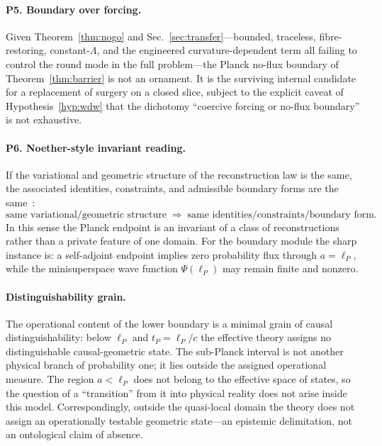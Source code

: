 \documentclass[aps,prd,twocolumn,superscriptaddress,nofootinbib,floatfix]{revtex4-2}
\theoremstyle{plain}
\theoremstyle{definition}
\newcommand{\lP}{\ell_P}
\begin{document}
\paragraph*{P5. Boundary over forcing.}
Given Theorem~\ref{thm:nogo} and Sec.~\ref{sec:transfer}---bounded, traceless, fibre-restoring, constant-$\Lambda$, and the engineered curvature-dependent term all failing to control the round mode in the full problem---the Planck no-flux boundary of Theorem~\ref{thm:barrier} is not an ornament. It is the surviving internal candidate for a replacement of surgery on a closed slice, subject to the explicit caveat of Hypothesis~\ref{hyp:wdw} that the dichotomy ``coercive forcing or no-flux boundary'' is not exhaustive.

\paragraph*{P6. Noether-style invariant reading.}
If the variational and geometric structure of the reconstruction law is the same, the associated identities, constraints, and admissible boundary forms are the same~\cite{Noether1918}:
\[
\text{same variational/geometric structure}\;\Longrightarrow\;\text{same identities/constraints/boundary form}.
\]
In this sense the Planck endpoint is an invariant of a class of reconstructions rather than a private feature of one domain. For the boundary module the sharp instance is: a self-adjoint endpoint implies zero probability flux through $a=\lP$, while the minisuperspace wave function $\Psi(\lP)$ may remain finite and nonzero.

\paragraph*{Distinguishability grain.}
The operational content of the lower boundary is a minimal grain of causal distinguishability: below $\lP$ and $t_P=\lP/c$ the effective theory assigns no distinguishable causal-geometric state. The sub-Planck interval is not another physical branch of probability one; it lies outside the assigned operational measure. The region $a<\lP$ does not belong to the effective space of states, so the question of a ``transition'' from it into physical reality does not arise inside this model. Correspondingly, outside the quasi-local domain the theory does not assign an operationally testable geometric state---an epistemic delimitation, not an ontological claim of absence.
\end{document}

